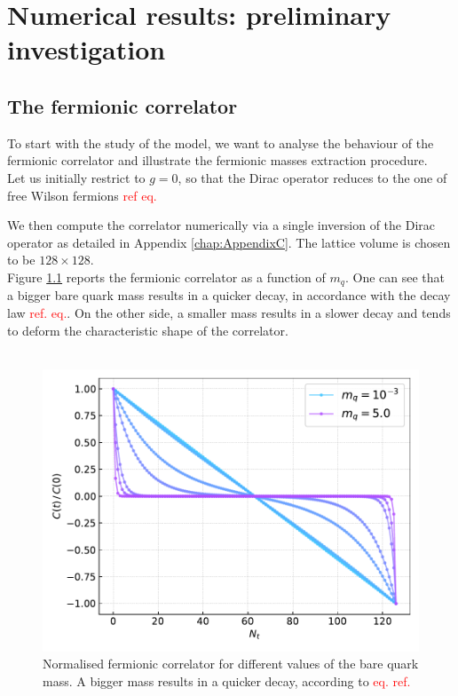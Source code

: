 \chapter{Numerical results: preliminary investigation}
\label{chapt:results_preliminary}


\section{The fermionic correlator}
To start with the study of the model, we want to analyse the behaviour of the fermionic correlator and illustrate the fermionic masses extraction procedure. \\
Let us initially restrict to $g = 0$, so that the Dirac operator reduces to the one of free Wilson fermions \textcolor{red}{ref eq.}
\raggedright We then compute the correlator numerically via a single inversion of the Dirac operator as detailed in Appendix \ref{chap:AppendixC}. The lattice volume is chosen to be $128 \times 128$. \\
Figure \ref{fig:correlator_mass} reports the fermionic correlator as a function of $m_q$. One can see that a bigger bare quark mass results in a quicker decay, in accordance with the decay law \textcolor{red}{ref. eq.}. On the other side, a smaller mass results in a slower decay and tends to deform the characteristic shape of the correlator. \\~\\
\begin{figure}[h]
    \centering 
    \includegraphics[scale=0.6]{figures/correlator/correlator.pdf}
    \caption[Fermionic correlator]{Normalised fermionic correlator for different values of the bare quark mass. A bigger mass results in a quicker decay, according to \textcolor{red}{eq. ref.}}
    \label{fig:correlator_mass}
\end{figure}
